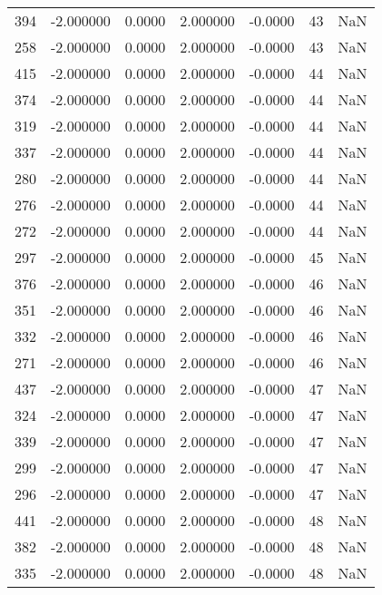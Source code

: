 \begin{tabular}{rrrrrrr}
394 &   -2.000000 &    0.0000 &    2.000000 &     -0.0000 &          43 & NaN \\
258 &   -2.000000 &    0.0000 &    2.000000 &     -0.0000 &          43 & NaN \\
415 &   -2.000000 &    0.0000 &    2.000000 &     -0.0000 &          44 & NaN \\
374 &   -2.000000 &    0.0000 &    2.000000 &     -0.0000 &          44 & NaN \\
319 &   -2.000000 &    0.0000 &    2.000000 &     -0.0000 &          44 & NaN \\
337 &   -2.000000 &    0.0000 &    2.000000 &     -0.0000 &          44 & NaN \\
280 &   -2.000000 &    0.0000 &    2.000000 &     -0.0000 &          44 & NaN \\
276 &   -2.000000 &    0.0000 &    2.000000 &     -0.0000 &          44 & NaN \\
272 &   -2.000000 &    0.0000 &    2.000000 &     -0.0000 &          44 & NaN \\
297 &   -2.000000 &    0.0000 &    2.000000 &     -0.0000 &          45 & NaN \\
376 &   -2.000000 &    0.0000 &    2.000000 &     -0.0000 &          46 & NaN \\
351 &   -2.000000 &    0.0000 &    2.000000 &     -0.0000 &          46 & NaN \\
332 &   -2.000000 &    0.0000 &    2.000000 &     -0.0000 &          46 & NaN \\
271 &   -2.000000 &    0.0000 &    2.000000 &     -0.0000 &          46 & NaN \\
437 &   -2.000000 &    0.0000 &    2.000000 &     -0.0000 &          47 & NaN \\
324 &   -2.000000 &    0.0000 &    2.000000 &     -0.0000 &          47 & NaN \\
339 &   -2.000000 &    0.0000 &    2.000000 &     -0.0000 &          47 & NaN \\
299 &   -2.000000 &    0.0000 &    2.000000 &     -0.0000 &          47 & NaN \\
296 &   -2.000000 &    0.0000 &    2.000000 &     -0.0000 &          47 & NaN \\
441 &   -2.000000 &    0.0000 &    2.000000 &     -0.0000 &          48 & NaN \\
382 &   -2.000000 &    0.0000 &    2.000000 &     -0.0000 &          48 & NaN \\
335 &   -2.000000 &    0.0000 &    2.000000 &     -0.0000 &          48 & NaN \\

\end{tabular}
